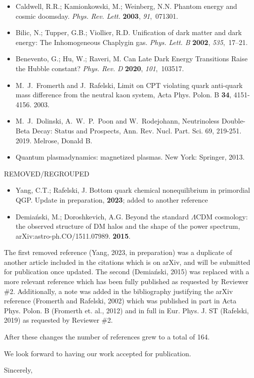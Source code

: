 \documentclass[a4paper, 10pt]{letter}
\begin{document}
\begin{letter}
\begin{itemize}
    \item Caldwell, R.R.; Kamionkowski, M.; Weinberg, N.N. {Phantom energy and cosmic doomsday}. {\em Phys. Rev. Lett.} {\bf 2003}, {\em 91},~071301.
    \item Bilic, N.; Tupper, G.B.; Viollier, R.D. {Unification of dark matter and dark energy: The Inhomogeneous Chaplygin gas}. {\em Phys. Lett. B} {\bf 2002}, {\em 535},~17--21.
    \item Benevento, G.; Hu, W.; Raveri, M. {Can Late Dark Energy Transitions Raise the Hubble constant?} {\em Phys. Rev. D} {\bf 2020}, {\em 101},~103517.
    \item M.~J.~Fromerth and J.~Rafelski, {Limit on CPT violating quark anti-quark mass difference from the neutral kaon system}, Acta Phys. Polon. B \textbf{34}, 4151-4156. 2003.
    \item M.~J.~Dolinski, A.~W.~P.~Poon and W.~Rodejohann, {Neutrinoless Double-Beta Decay: Status and Prospects}, Ann. Rev. Nucl. Part. Sci. 69, 219-251. 2019.
    Melrose, Donald B. \item Quantum plasmadynamics: magnetized plasmas. New York: Springer, 2013.
\end{itemize}

REMOVED/REGROUPED
\begin{itemize}
    \item Yang, C.T.; Rafelski, J. {Bottom quark chemical nonequilibrium in primordial QGP}. Update in preparation, {\bf 2023}; added to another reference
    \item Demia\'nski, M.; Doroshkevich, A.G. {Beyond the standard $\Lambda$CDM cosmology: the observed structure of DM halos and the shape of the power spectrum}, arXiv:astro-ph.CO/1511.07989. {\bf 2015}.
\end{itemize}
The first removed reference (Yang, 2023, in preparation) was a duplicate of another article included in the citations which is on arXiv, and will be submitted for publication once updated. The second (Demia\'nski, 2015) was replaced with a more relevant reference which has been fully published as requested by Reviewer \#2. Additionally, a note was added in the bibliography justifying the arXiv reference (Fromerth and Rafelski, 2002) which was published in part in Acta Phys. Polon. B (Fromerth et. al., 2012) and in full in Eur. Phys. J. ST (Rafelski, 2019) as requested by Reviewer \#2.

After these changes the number of references grew to a total of 164. 

We look forward to having our work accepted for publication. 

\closing{Sincerely,}

\end{letter}
\end{document}
